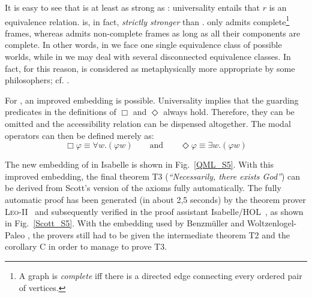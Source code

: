 \documentclass{article}
\newcommand{\Dia}{\Diamond} %
\newcommand{\BlackBox}{\blacksquare}
\newcommand{\BlackDia}{\Diamondblack}
\begin{document}
It is easy to see that \SFiveU is at least as strong as \SFive:
universality entails that $r$ is an equivalence relation. \SFiveU is,
in fact, \emph{strictly stronger} than \SFive. \SFiveU only admits
complete\footnote{A graph is \emph{complete} iff there is a directed
  edge connecting every ordered pair of vertices.} frames, whereas
\SFive admits non-complete frames as long as all their components are
complete. In other words, in \SFiveU we face one single equivalence
class of possible worlds, while in \SFive we may deal with several
disconnected equivalence classes. In fact, for this reason, \SFiveU is
considered as metaphysically more appropriate by some philosophers;
cf. \cite[p.~127]{williamson13}.

For \SFiveU, an improved embedding is possible. Universality implies
that the guarding predicates in the definitions of $\Box$ and
$\Diamond$ always hold. Therefore, they can be omitted and the
accessibility relation can be dispensed altogether. The modal
operators can then be defined merely as:
\[\Box \varphi \equiv \forall w. (\varphi w) \qquad \text{and}
\qquad \Dia \varphi \equiv \exists w. (\varphi w)\]

The new embedding of \SFiveU in Isabelle is shown in Fig.~\ref{QML_S5}.
%
%
With this improved embedding, the final theorem T3
(\textit{``Necessarily, there exists God''}) can be derived from
Scott's version of the axioms fully automatically.  The fully
automatic proof has been generated (in about 2,5 seconds) by the theorem prover
\textsc{Leo-II}~\cite{C26} and subsequently verified in the proof
assistant Isabelle/HOL~\cite{NPW02}, as shown in Fig.~\ref{Scott_S5}.
With the embedding used by Benzm\"uller and Woltzenlogel-Paleo , the
provers still had to be given the intermediate theorem T2 and the corollary
C in order to manage to prove T3.
\end{document}

